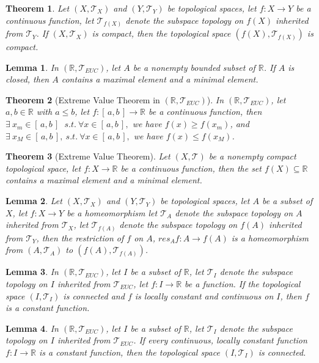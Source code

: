 \documentclass[11pt]{article}
\theoremstyle{break}
\theoremstyle{break}
\newtheorem{thm}{Theorem}[section]
\newtheorem{lem}{Lemma}[thm]
\newcommand{\R}{\mathbb{R}}
\newcommand{\T}{\mathcal{T}}
\newcommand{\Intab}{[\,a,b\,]}
\begin{document}
	\begin{thm}
		Let $(X,\T_X)$ and $(Y,\T_Y)$ be topological spaces, let $f:X \to Y$ be a continuous function, let $\T_{f(X)}$ denote the subspace topology on $f(X)$ inherited from $\T_Y$. If $(X,\T_X)$ is compact, then the topological space $(f(X),\T_{f(X)})$ is compact.
	\end{thm}	
	
	\begin{lem}
		In $(\R,\T_{EUC})$, let $A$ be a nonempty bounded subset of $\R$. If $A$ is closed, then $A$ contains a maximal element and a minimal element.
	\end{lem}		
	
	\begin{thm}[Extreme Value Theorem in $(\R,\T_{EUC})$]
		In $(\R,\T_{EUC})$, let $a,b \in \R$ with $a \leq b$, let $f:[\,a,b\,] \to \R$ be a continuous function, then \mbox{$\exists \ x_m \in [\,a,b\,]$} $\ s.t. \ \forall x \in \Intab,$ we have $f(x) \geq f(x_m)$, and $\exists \ x_M \in \Intab, \ s.t. \ \forall x \in \Intab,$ we have $f(x) \leq f(x_M)$.
	\end{thm}
	
	\begin{thm}[Extreme Value Theorem]
		Let $(X,\T)$ be a nonempty compact topological space, let $f:X \to \R$ be a continuous function, then the set $f(X) \subseteq \R$ contains a maximal element and a minimal element.
	\end{thm}
	
	\begin{lem}	
		Let $(X,\T_X)$ and $(Y,\T_Y)$ be topological spaces, let $A$ be a subset of $X$, let $f:X \to Y$ be a homeomorphism let $\T_A$ denote the subspace topology on $A$ inherited from $\T_X$, let $\T_{f(A)}$ denote the subspace topology on $f(A)$ inherited from $\T_Y$, then the restriction of $f$ on $A$, $res_Af:A \to f(A)$ is a homeomorphism from $(A, \T_A)$ to $(f(A),\T_{f(A)})$.
	\end{lem}
	
	\begin{lem}
		In $(\R,\T_{EUC})$, let $I$ be a subset of $\R$, let $\T_I$ denote the subspace topology on $I$ inherited from $\T_{EUC}$, let $f:I \to \R$ be a function. If the topological space $(I,\T_I)$ is connected and $f$ is locally constant and continuous on $I$, then $f$ is a constant function.
	\end{lem}
	
	\begin{lem}
		In $(\R,\T_{EUC})$, let $I$ be a subset of $\R$, let $\T_I$ denote the subspace topology on $I$ inherited from $\T_{EUC}$. If every continuous, locally constant function $f:I \to \R$ is a constant function, then the topological space $(I,\T_I)$ is connected.
	\end{lem}
	
\end{document}
